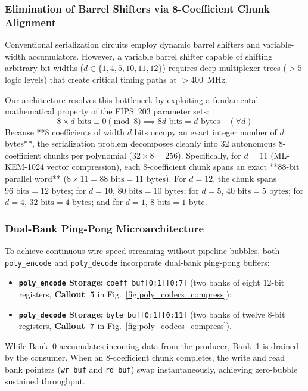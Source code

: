 \subsubsection{Elimination of Barrel Shifters via 8-Coefficient Chunk Alignment}
Conventional serialization circuits employ dynamic barrel shifters and variable-width accumulators. However, a variable barrel shifter capable of shifting arbitrary bit-widths ($d \in \{1, 4, 5, 10, 11, 12\}$) requires deep multiplexer trees ($> 5$ logic levels) that create critical timing paths at $> 400$~MHz.

Our architecture resolves this bottleneck by exploiting a fundamental mathematical property of the FIPS~203 parameter sets:
\begin{equation}
\label{eq:codec_chunk_property}
8 \times d \text{ bits} \equiv 0 \pmod 8 \implies 8d\text{ bits} = d\text{ bytes} \quad (\forall d)
\end{equation}
Because **8 coefficients of width $d$ bits occupy an exact integer number of $d$ bytes**, the serialization problem decomposes cleanly into 32 autonomous 8-coefficient chunks per polynomial ($32 \times 8 = 256$).
Specifically, for $d = 11$ (ML-KEM-1024 vector compression), each 8-coefficient chunk spans an exact **88-bit parallel word** ($8 \times 11 = 88\text{ bits} = 11\text{ bytes}$). For $d = 12$, the chunk spans $96\text{ bits} = 12\text{ bytes}$; for $d = 10$, $80\text{ bits} = 10\text{ bytes}$; for $d = 5$, $40\text{ bits} = 5\text{ bytes}$; for $d = 4$, $32\text{ bits} = 4\text{ bytes}$; and for $d = 1$, $8\text{ bits} = 1\text{ byte}$.

\subsubsection{Dual-Bank Ping-Pong Microarchitecture}
To achieve continuous wire-speed streaming without pipeline bubbles, both \texttt{poly\_encode} and \texttt{poly\_decode} incorporate dual-bank ping-pong buffers:
\begin{itemize}
    \item \textbf{\texttt{poly\_encode} Storage:} \texttt{coeff\_buf[0:1][0:7]} (two banks of eight 12-bit registers, \textbf{Callout~5} in Fig.~\ref{fig:poly_codecs_compress});
    \item \textbf{\texttt{poly\_decode} Storage:} \texttt{byte\_buf[0:1][0:11]} (two banks of twelve 8-bit registers, \textbf{Callout~7} in Fig.~\ref{fig:poly_codecs_compress}).
\end{itemize}
While Bank~0 accumulates incoming data from the producer, Bank~1 is drained by the consumer. When an 8-coefficient chunk completes, the write and read bank pointers (\texttt{wr\_buf} and \texttt{rd\_buf}) swap instantaneously, achieving zero-bubble sustained throughput.

